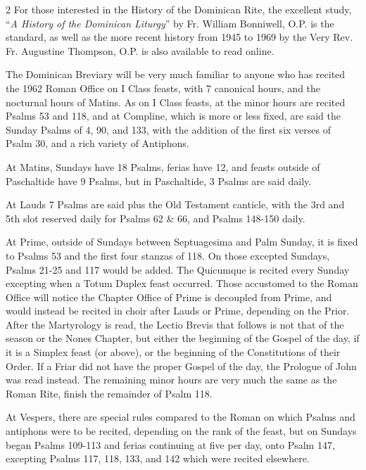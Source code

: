 \begin{multicols*}{2}
For those interested in the History of the Dominican Rite, the excellent study, ``\emph{A History of the Dominican Liturgy}'' by Fr. William Bonniwell, O.P. is the standard, as well as the more recent history from 1945 to 1969 by the Very Rev. Fr. Augustine Thompson, O.P. is also available to read online.


{\color{Red} }

The Dominican Breviary will be very much familiar to anyone who has recited the 1962 Roman Office on I Class feasts, with 7 canonical hours, and the nocturnal hours of Matins. As on I Class feasts, at the minor hours are recited Psalms 53 and 118, and at Compline, which is more or less fixed, are said the Sunday Psalms of 4, 90, and 133, with the addition of the first six verses of Psalm 30, and a rich variety of Antiphons.

At Matins, Sundays have 18 Psalms, ferias have 12, and feasts outside of Paschaltide have 9 Psalms, but in Paschaltide, 3 Psalms are said daily.

At Lauds 7 Psalms are said plus the Old Testament canticle, with the 3rd and 5th slot reserved daily for Psalms 62 \& 66, and Psalms 148-150 daily.

At Prime, outside of Sundays between Septuagesima and Palm Sunday, it is fixed to Psalms 53 and the first four stanzas of 118. On those excepted Sundays, Psalms 21-25 and 117 would be added. The Quicumque is recited every Sunday excepting when a Totum Duplex feast occurred. Those accustomed to the Roman Office will notice the Chapter Office of Prime is decoupled from Prime, and would instead be recited in choir after Lauds or Prime, depending on the Prior. After the Martyrology is read, the Lectio Brevis that follows is not that of the season or the Nones Chapter, but either the beginning of the Gospel of the day, if it is a Simplex feast (or above), or the beginning of the Constitutions of their Order. If a Friar did not have the proper Gospel of the day, the Prologue of John was read instead. The remaining minor hours are very much the same as the Roman Rite, finish the remainder of Psalm 118.

At Vespers, there are special rules compared to the Roman on which Psalms and antiphons were to be recited, depending on the rank of the feast, but on Sundays began Psalms 109-113 and ferias continuing at five per day, onto Psalm 147, excepting Psalms 117, 118, 133, and 142 which were recited elsewhere.



\end{multicols*}
